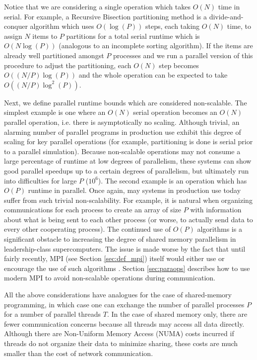 Notice that we are considering a single operation which takes $O(N)$
time in serial.
For example, a Recursive Bisection partitioning method is a
divide-and-conquer algorithm which uses $O(\log(P))$ steps, each
taking $O(N)$ time, to assign $N$ items to $P$ partitions
for a total serial runtime which is $O(N\log(P))$
(analogous to an incomplete sorting algorithm).
If the items are already well partitioned amongst $P$ processes
and we run a parallel version of this procedure to adjust the
partitioning, each $O(N)$ step becomes $O((N/P)\log(P))$
and the whole operation can be expected to take $O((N/P)\log^2(P))$.

Next, we define parallel runtime bounds which are considered non-scalable.
The simplest example is one where an $O(N)$ serial operation becomes
an $O(N)$ parallel operation, i.e. there is asymptotically no scaling.
Although trivial, an alarming number of parallel programs in production
use exhibit this degree of scaling for key parallel operations
(for example, partitioning is done is serial prior to a parallel simulation).
Because non-scalable operations may not consume a large percentage
of runtime at low degrees of parallelism,
these systems can show good parallel speedups up to a certain degrees of parallelism,
but ultimately run into difficulties for large $P$ ($10^6$).
The second example is an operation which has $O(P)$ runtime in parallel.
Once again, may systems in production use today suffer from such
trivial non-scalability.
For example, it is natural when organizing communications for each process to create
an array of size $P$ with information about what is being sent to each
other process (or worse, to actually send data to every other cooperating process).
The continued use of $O(P)$ algorithms is a significant obstacle to
increasing the degree of shared memory parallelism in leadership-class supercomputers.
The issue is made worse by the fact that until fairly recently,
MPI (see Section \ref{sec:def_mpi}) itself would either use
or encourage the use of such algorithms \cite{balaji2009mpi}.
Section \ref{sec:paraops} describes how to use modern MPI
to avoid non-scalable operations during communication.

All the above considerations have analogues for the case of shared-memory programming,
in which case one can exchange the number of parallel processes $P$ for a number
of parallel threads $T$.
In the case of shared memory only, there are fewer communication concerns because
all threads may access all data directly.
Although there are Non-Uniform Memory Access (NUMA) costs incurred if threads do
not organize their data to minimize sharing, these costs are much smaller than
the cost of network communication.

